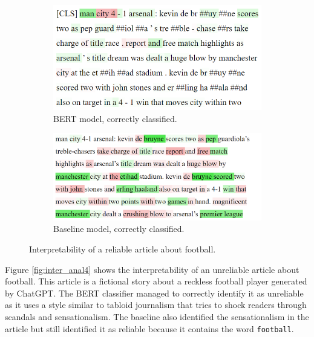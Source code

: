 \begin{figure}[H]
    \centering
    \begin{subfigure}{.5\textwidth}
      \centering
      \includegraphics[width=\linewidth]{obrazky-figures/man-city.png}
      \caption{BERT model, correctly classified.}
      \label{fig:inter_anal3_a}
    \end{subfigure}%
    \begin{subfigure}{.5\textwidth}
      \centering
      \includegraphics[width=\linewidth]{obrazky-figures/bayes_football1.png}
      \caption{Baseline model, correctly classified.}
      \label{fig:inter_anal3_b}
    \end{subfigure}
    \caption{Interpretability of a reliable article about football.}
    \label{fig:inter_anal3}
\end{figure}

Figure \ref{fig:inter_anal4} shows the interpretability of an unreliable article about football. This article is a fictional story about a reckless football player generated by ChatGPT. The BERT classifier managed to correctly identify it as unreliable as it uses a style similar to tabloid journalism that tries to shock readers through scandals and sensationalism. The baseline also identified the sensationalism in the article but still identified it as reliable because it contains the word \texttt{football}.


